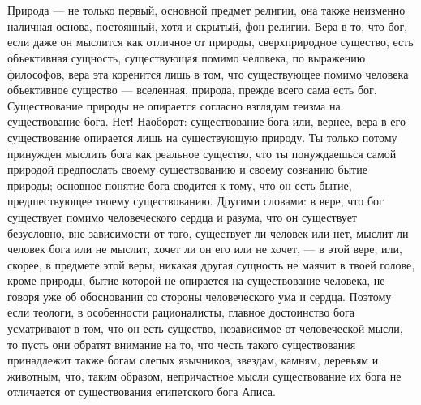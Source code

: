 \documentclass[12pt]{article}
\begin{document}
\section{}

Природа --- не только первый, основной предмет религии, она также неизменно наличная основа, постоянный, хотя и скрытый, фон религии. Вера в то, что бог, если даже он мыслится как отличное от природы, сверхприродное существо, есть объективная сущность, существующая помимо человека, по выражению философов, вера эта коренится лишь в том, что существующее помимо человека объективное существо --- вселенная, природа, прежде всего сама есть бог. Существование природы не опирается согласно взглядам теизма на существование бога. Нет! Наоборот: существование бога или, вернее, вера в его существование опирается лишь на существующую природу. Ты только потому принужден мыслить бога как реальное существо, что ты понуждаешься самой природой предпослать своему существованию и своему сознанию бытие природы; основное понятие бога сводится к тому, что он есть бытие, предшествующее твоему существованию. Другими словами: в вере, что бог существует помимо человеческого сердца и разума, что он существует безусловно, вне зависимости от того, существует ли человек или нет, мыслит ли человек бога или не мыслит, хочет ли он его или не хочет, --- в этой вере, или, скорее, в предмете этой веры, никакая другая сущность не маячит в твоей голове, кроме природы, бытие которой не опирается на существование человека, не говоря уже об обосновании со стороны человеческого ума и сердца. Поэтому если теологи, в особенности рационалисты, главное достоинство бога усматривают в том, что он есть существо, независимое от человеческой мысли, то пусть они обратят внимание на то, что честь такого существования принадлежит также богам слепых язычников, звездам, камням, деревьям и животным, что, таким образом, непричастное мысли существование их бога не отличается от существования египетского бога Аписа.



\section{}
\end{document}
